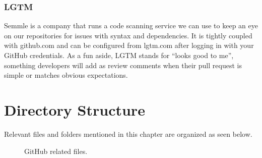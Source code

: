 \subsubsection{LGTM}
\justify{}
Semmle is a company that runs a code scanning service we can use to keep
an eye on our repositories for issues with syntax and dependencies. It
is tightly coupled with github.com and can be configured from lgtm.com
after logging in with your GitHub credentials.
\justify{}
As a fun aside, LGTM stands for ``looks good to me'', something developers
will add as review comments when their pull request is simple or matches
obvious expectations.
\clearpage
\section{Directory Structure}
\justify{}
Relevant files and folders mentioned in this chapter are organized as
seen below.

\begin{figure}[!htb]
      \centering
      
      \caption{GitHub related files.}
      \label{githubfiles}
\end{figure}
